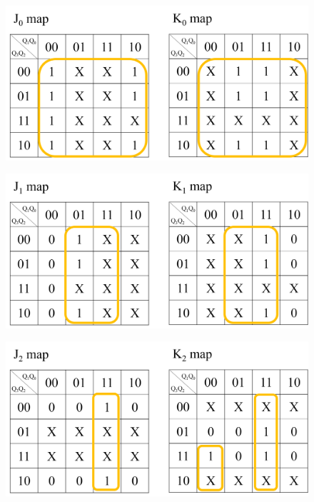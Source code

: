 \documentclass{article}
\begin{document}
\begin{figure}[!hbp]
  \centering
  \includegraphics[scale=0.5]{4/k1.png}
\end{figure}

\begin{figure}[!hbp]
  \centering
  \includegraphics[scale=0.5]{4/k2.png}
\end{figure}

\newpage

\begin{figure}[!hbp]
  \centering
  \includegraphics[scale=0.5]{4/k3.png}
\end{figure}
\end{document}
